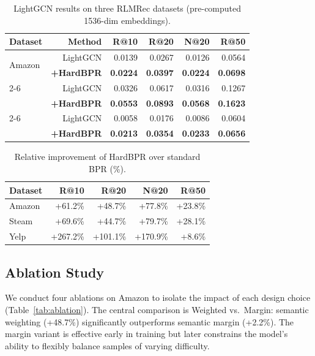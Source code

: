 \documentclass[11pt,a4paper]{article}
\begin{document}
\begin{table}[ht]
    \centering
    \caption{LightGCN results on three RLMRec datasets (pre-computed 1536-dim embeddings).}
    \label{tab:main}
    \begin{tabular}{lrrrrr}
        \toprule
        Dataset & Method & R@10 & R@20 & N@20 & R@50 \\
        \midrule
        \multirow{2}{*}{Amazon}
        & LightGCN & 0.0139 & 0.0267 & 0.0126 & 0.0564 \\
        & \textbf{+HardBPR} & \textbf{0.0224} & \textbf{0.0397} & \textbf{0.0224} & \textbf{0.0698} \\
        \cmidrule(lr){2-6}
        \multirow{2}{*}{Steam}
        & LightGCN & 0.0326 & 0.0617 & 0.0316 & 0.1267 \\
        & \textbf{+HardBPR} & \textbf{0.0553} & \textbf{0.0893} & \textbf{0.0568} & \textbf{0.1623} \\
        \cmidrule(lr){2-6}
        \multirow{2}{*}{Yelp}
        & LightGCN & 0.0058 & 0.0176 & 0.0086 & 0.0604 \\
        & \textbf{+HardBPR} & \textbf{0.0213} & \textbf{0.0354} & \textbf{0.0233} & \textbf{0.0656} \\
        \bottomrule
    \end{tabular}
\end{table}

\begin{table}[ht]
    \centering
    \caption{Relative improvement of HardBPR over standard BPR (\%).}
    \label{tab:relative}
    \begin{tabular}{lrrrr}
        \toprule
        Dataset & R@10 & R@20 & N@20 & R@50 \\
        \midrule
        Amazon & +61.2\% & +48.7\% & +77.8\% & +23.8\% \\
        Steam  & +69.6\% & +44.7\% & +79.7\% & +28.1\% \\
        Yelp   & +267.2\% & +101.1\% & +170.9\% & +8.6\% \\
        \bottomrule
    \end{tabular}
\end{table}

\subsection{Ablation Study}

We conduct four ablations on Amazon to isolate the impact of each design choice (Table~\ref{tab:ablation}). The central comparison is Weighted vs.\ Margin: semantic weighting (+48.7\%) significantly outperforms semantic margin (+2.2\%). The margin variant is effective early in training but later constrains the model's ability to flexibly balance samples of varying difficulty.
\end{document}
